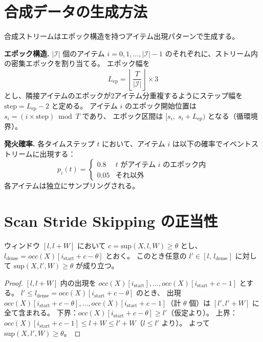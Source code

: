 \appendix

\section{合成データの生成方法}

合成ストリームはエポック構造を持つアイテム出現パターンで生成する。

\textbf{エポック構造.}
$|\mathcal{I}|$ 個のアイテム $i = 0, 1, \ldots, |\mathcal{I}|{-}1$ のそれぞれに、ストリーム内の密集エポックを割り当てる。
エポック幅を
\[
  L_{\mathrm{ep}} = \left\lfloor \frac{T}{|\mathcal{I}|} \right\rfloor \times 3
\]
とし、隣接アイテムのエポックが2アイテム分重複するようにステップ幅を
$\mathrm{step} = L_{\mathrm{ep}} - 2$ と定める。
アイテム $i$ のエポック開始位置は $s_i = (i \times \mathrm{step}) \bmod T$ であり、
エポック区間は $[s_i,\; s_i + L_{\mathrm{ep}})$ となる（循環境界）。

\textbf{発火確率.}
各タイムステップ $t$ において、アイテム $i$ は以下の確率でイベントストリームに出現する：
\[
  p_i(t) =
  \begin{cases}
    0.8 & t \text{ がアイテム } i \text{ のエポック内} \\
    0.05 & \text{それ以外}
  \end{cases}
\]
各アイテムは独立にサンプリングされる。

\section{Scan Stride Skipping の正当性}

\begin{lemma}[密集フェーズの正当性]\label{lem:stride_dense}
ウィンドウ $[l, l+W]$ において $c = \mathrm{sup}(X, l, W) \geq \theta$ とし、
$l_{\mathrm{dense}} = \mathit{occ}(X)[i_{\mathrm{start}} + c - \theta]$ とおく。
このとき任意の $l' \in [l,\, l_{\mathrm{dense}}]$ に対して
$\mathrm{sup}(X, l', W) \geq \theta$ が成り立つ。
\end{lemma}

\begin{proof}
$[l, l+W]$ 内の出現を $\mathit{occ}(X)[i_{\mathrm{start}}], \ldots, \mathit{occ}(X)[i_{\mathrm{start}}+c-1]$ とする。
$l' \leq l_{\mathrm{dense}} = \mathit{occ}(X)[i_{\mathrm{start}}+c-\theta]$ のとき、
出現 $\mathit{occ}(X)[i_{\mathrm{start}}+c-\theta], \ldots, \mathit{occ}(X)[i_{\mathrm{start}}+c-1]$（計 $\theta$ 個）は
$[l', l'+W]$ に全て含まれる。
下界：$\mathit{occ}(X)[i_{\mathrm{start}}+c-\theta] \geq l'$（仮定より）。
上界：$\mathit{occ}(X)[i_{\mathrm{start}}+c-1] \leq l+W \leq l'+W$（$l \leq l'$ より）。
よって $\mathrm{sup}(X, l', W) \geq \theta$。
\end{proof}

